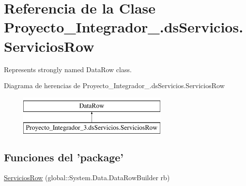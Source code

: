 \hypertarget{class_proyecto___integrador__3_1_1ds_servicios_1_1_servicios_row}{\section{Referencia de la Clase Proyecto\-\_\-\-Integrador\-\_.\-ds\-Servicios.\-Servicios\-Row}
\label{class_proyecto___integrador__3_1_1ds_servicios_1_1_servicios_row}
}


Represents strongly named Data\-Row class.  


Diagrama de herencias de Proyecto\-\_\-\-Integrador\-\_.\-ds\-Servicios.\-Servicios\-Row\begin{figure}[H]
\begin{center}
\leavevmode
\includegraphics[height=2.000000cm]{class_proyecto___integrador__3_1_1ds_servicios_1_1_servicios_row}
\end{center}
\end{figure}
\subsection*{Funciones del 'package'}
\begin{DoxyCompactItemize}
\item 
\hyperlink{class_proyecto___integrador__3_1_1ds_servicios_1_1_servicios_row_a3e8c82b3f9d5089c8437d38a4980bb5d}{Servicios\-Row} (global\-::\-System.\-Data.\-Data\-Row\-Builder rb)
\end{DoxyCompactItemize}
